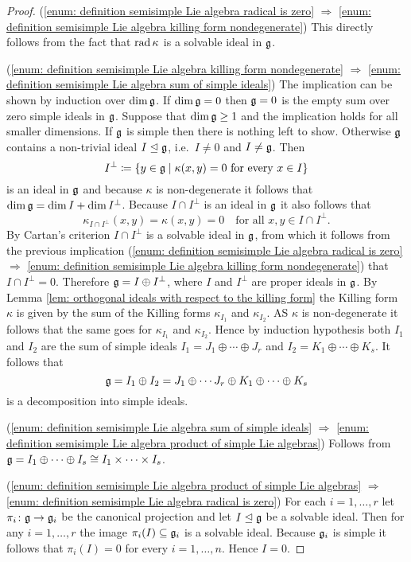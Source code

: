 \begin{proof}
 (\ref{enum: definition semisimple Lie algebra radical is zero} $\Rightarrow$ \ref{enum: definition semisimple Lie algebra killing form nondegenerate}) This directly follows from the fact that $\operatorname{rad} \kappa$ is a solvable ideal in $\mathfrak{g}$.
 
 (\ref{enum: definition semisimple Lie algebra killing form nondegenerate} $\Rightarrow$ \ref{enum: definition semisimple Lie algebra sum of simple ideals}) The implication can be shown by induction over $\dim \mathfrak{g}$. If $\dim \mathfrak{g} = 0$ then $\mathfrak{g} = 0$ is the empty sum over zero simple ideals in $\mathfrak{g}$. Suppose that $\dim \mathfrak{g} \geq 1$ and the implication holds for all smaller dimensions. If $\mathfrak{g}$ is simple then there is nothing left to show. Otherwise $\mathfrak{g}$ contains a non-trivial ideal $I \trianglelefteq \mathfrak{g}$, i.e.\ $I \neq 0$ and $I \neq \mathfrak{g}$. Then
 \[
  I^\perp \coloneqq \{y \in \mathfrak{g} \mid \text{$\kappa(x,y) = 0$ for every $x \in I$}\}
 \]
 is an ideal in $\mathfrak{g}$ and because $\kappa$ is non-degenerate it follows that $\dim \mathfrak{g} = \dim I + \dim I^\perp$. Because $I \cap I^\perp$ is an ideal in $\mathfrak{g}$ it also follows that
 \[
  \kappa_{I \cap I^\perp}(x,y) = \kappa(x,y) = 0 \quad \text{for all $x,y \in I \cap I^\perp$}.
 \]
 By Cartan’s criterion $I \cap I^\perp$ is a solvable ideal in $\mathfrak{g}$, from which it follows from the previous implication (\ref{enum: definition semisimple Lie algebra radical is zero} $\Rightarrow$ \ref{enum: definition semisimple Lie algebra killing form nondegenerate}) that $I \cap I^\perp = 0$. Therefore $\mathfrak{g} = I \oplus I^\perp$, where $I$ and $I^\perp$ are proper ideals in $\mathfrak{g}$. By Lemma \ref{lem: orthogonal ideals with respect to the killing form} the Killing form $\kappa$ is given by the sum of the Killing forms $\kappa_{I_1}$ and $\kappa_{I_2}$. AS $\kappa$ is non-degenerate it follows that the same goes for $\kappa_{I_1}$ and $\kappa_{I_2}$. Hence by induction hypothesis both $I_1$ and $I_2$ are the sum of simple ideals $I_1 = J_1 \oplus \dotsb \oplus J_r$ and $I_2 = K_1 \oplus \dotsb \oplus K_s$. It follows that
 \[
  \mathfrak{g} = I_1 \oplus I_2 = J_1 \oplus \dotsb J_r \oplus K_1 \oplus \dotsb \oplus K_s
 \]
 is a decomposition into simple ideals.

 (\ref{enum: definition semisimple Lie algebra sum of simple ideals} $\Rightarrow$ \ref{enum: definition semisimple Lie algebra product of simple Lie algebras}) Follows from $\mathfrak{g} = I_1 \oplus \dotsb \oplus I_s \cong I_1 \times \dotsb \times I_s$.
 
 (\ref{enum: definition semisimple Lie algebra product of simple Lie algebras} $\Rightarrow$ \ref{enum: definition semisimple Lie algebra radical is zero}) For each $i = 1, \dotsc, r$ let $\pi_i \colon \mathfrak{g} \to \mathfrak{g}_i$ be the canonical projection and let $I \trianglelefteq \mathfrak{g}$ be a solvable ideal. Then for any $i = 1, \dotsc, r$ the image $\pi_i(I) \subseteq \mathfrak{g}_i$ is a solvable ideal. Because $\mathfrak{g}_i$ is simple it follows that $\pi_i(I) = 0$ for every $i = 1, \dotsc, n$. Hence $I = 0$.
 

\end{proof}
